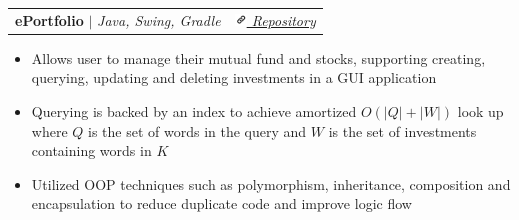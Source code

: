 \documentclass[letterpaper, 10pt]{article}
\makeatletter
\newcommand{\resumeProjectHeading}[2]{
    \begin{tabular*}{\textwidth}{l@{\extracolsep{\fill}}r}
        \small#1 & #2 \\
    \end{tabular*}\vspace{-1.5em}
}
\newenvironment{ResumeItem}{
    \vspace{-0.5em}
    \begin{itemize}
        \setlength\itemsep{-0.3em}
        }{
    \end{itemize}\vspace{-0.3em}}
\makeatother
\begin{document}
    \resumeProjectHeading
    {\textbf{ePortfolio} $|$ \emph{Java, Swing, Gradle}}{\href{https://github.com/Internal-Compiler-Error/ePortfolio}{\itshape\includegraphics[height=9pt, trim=0 5cm 0 -1.5cm]{link-icon} Repository}}
    \begin{ResumeItem}
        \item{Allows user to manage their mutual fund and stocks, supporting creating, querying, updating and deleting investments in a GUI application}
        \item{Querying is backed by an index to achieve amortized $O(|Q| + |W|)$ look up where $Q$ is the set of words in the query and $W$ is the set of investments containing words in $K$}
        \item{Utilized OOP techniques such as polymorphism, inheritance, composition and encapsulation to reduce duplicate code and improve logic flow}
    \end{ResumeItem}
\end{document}

